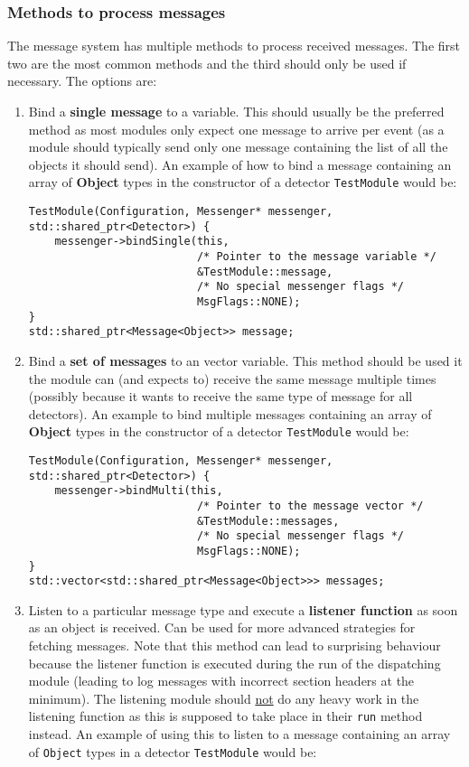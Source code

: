 \subsubsection{Methods to process messages}
The message system has multiple methods to process received messages. The first two are the most common methods and the third should only be used if necessary. The options are:
\begin{enumerate}
\item Bind a \textbf{single message} to a variable. This should usually be the preferred method as most modules only expect one message to arrive per event (as a module should typically send only one message containing the list of all the objects it should send). An example of how to bind a message containing an array of \textbf{Object} types in the constructor of a detector \texttt{TestModule} would be:
\begin{verbatim}
TestModule(Configuration, Messenger* messenger, std::shared_ptr<Detector>) {
    messenger->bindSingle(this, 
                          /* Pointer to the message variable */
                          &TestModule::message,
                          /* No special messenger flags */
                          MsgFlags::NONE);
}
std::shared_ptr<Message<Object>> message;
\end{verbatim}
\item Bind a \textbf{set of messages} to an vector variable. This method should be used it the module can (and expects to) receive the same message multiple times (possibly because it wants to receive the same type of message for all detectors). An example to bind multiple messages containing an array of \textbf{Object} types in the constructor of a detector \texttt{TestModule} would be:
\begin{verbatim}
TestModule(Configuration, Messenger* messenger, std::shared_ptr<Detector>) {
    messenger->bindMulti(this,
                          /* Pointer to the message vector */
                          &TestModule::messages,
                          /* No special messenger flags */
                          MsgFlags::NONE);
}
std::vector<std::shared_ptr<Message<Object>>> messages;
\end{verbatim}
\item Listen to a particular message type and execute a \textbf{listener function} as soon as an object is received. Can be used for more advanced strategies for fetching messages. Note that this method can lead to surprising behaviour because the listener function is executed during the run of the dispatching module (leading to log messages with incorrect section headers at the minimum). The listening module should \underline{not} do any heavy work in the listening function as this is supposed to take place in their \texttt{run} method instead. An example of using this to listen to a message containing an array of \texttt{Object} types in a detector \texttt{TestModule} would be:

\end{enumerate}
